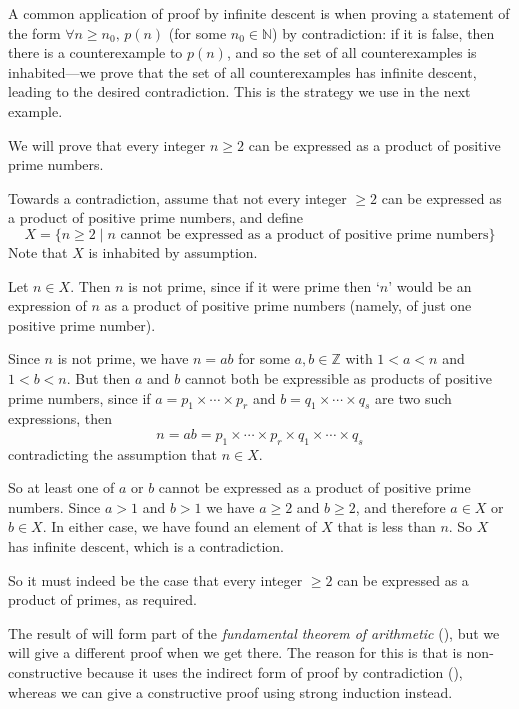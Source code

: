 A common application of proof by infinite descent is when proving a statement of the form $\forall n \ge n_0,\, p(n)$ (for some $n_0 \in \mathbb{N}$) by contradiction: if it is false, then there is a counterexample to $p(n)$, and so the set of all counterexamples is inhabited---we prove that the set of all counterexamples has infinite descent, leading to the desired contradiction. This is the strategy we use in the next example.

\begin{example}
\label{exExistenceOfPrimeFactorisationbyInfiniteDescent}
We will prove that every integer $n \ge 2$ can be expressed as a product of positive prime numbers.

Towards a contradiction, assume that not every integer $\ge 2$ can be expressed as a product of positive prime numbers, and define
\[ X = \{ n \ge 2 \mid n \text{ cannot be expressed as a product of positive prime numbers} \} \]
Note that $X$ is inhabited by assumption.

Let $n \in X$. Then $n$ is not prime, since if it were prime then `$n$' would be an expression of $n$ as a product of positive prime numbers (namely, of just one positive prime number).

Since $n$ is not prime, we have $n=ab$ for some $a,b \in \mathbb{Z}$ with $1<a<n$ and $1<b<n$. But then $a$ and $b$ cannot both be expressible as products of positive prime numbers, since if $a = p_1 \times \cdots \times p_r$ and $b = q_1 \times \cdots \times q_s$ are two such expressions, then
\[ n = ab = p_1 \times \cdots \times p_r \times q_1 \times \cdots \times q_s \]
contradicting the assumption that $n \in X$.

So at least one of $a$ or $b$ cannot be expressed as a product of positive prime numbers. Since $a > 1$ and $b > 1$ we have $a \ge 2$ and $b \ge 2$, and therefore $a \in X$ or $b \in X$. In either case, we have found an element of $X$ that is less than $n$. So $X$ has infinite descent, which is a contradiction.

So it must indeed be the case that every integer $\ge 2$ can be expressed as a product of primes, as required.
\end{example}

The result of  will form part of the \textit{fundamental theorem of arithmetic} (), but we will give a different proof when we get there. The reason for this is that  is non-constructive because it uses the indirect form of proof by contradiction (), whereas we can give a constructive proof using strong induction instead.

